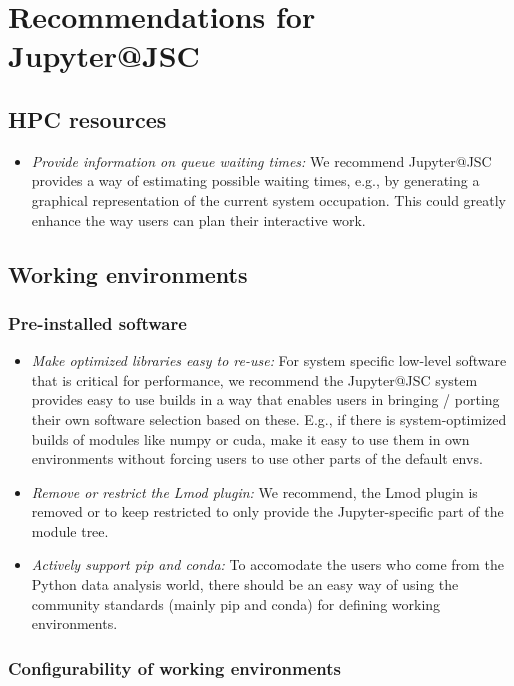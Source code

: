 \section{Recommendations for Jupyter@JSC}

\subsection{HPC resources}

\begin{itemize}
  \item \emph{Provide information on queue waiting times:} We recommend Jupyter@JSC provides a way of estimating possible waiting times, e.g., by generating a graphical representation of the current system occupation.
  This could greatly enhance the way users can plan their interactive work.
\end{itemize}

\subsection{Working environments}

\subsubsection{Pre-installed software}

\begin{itemize}
  \item \emph{Make optimized libraries easy to re-use:} For system specific low-level software that is critical for performance, we recommend the Jupyter@JSC system provides easy to use builds in a way that enables users in bringing / porting their own software selection based on these. E.g., if there is system-optimized builds of modules like numpy or cuda, make it easy to use them in own environments without forcing users to use other parts of the default envs.
  \item \emph{Remove or restrict the Lmod plugin:} We recommend, the Lmod plugin is removed or to keep restricted to only provide the Jupyter-specific part of the module tree.
  \item \emph{Actively support pip and conda:} To accomodate the users who come from the Python data analysis world, there should be an easy way of using the community standards (mainly pip and conda) for defining working environments.
\end{itemize}

\subsubsection{Configurability of working environments}

